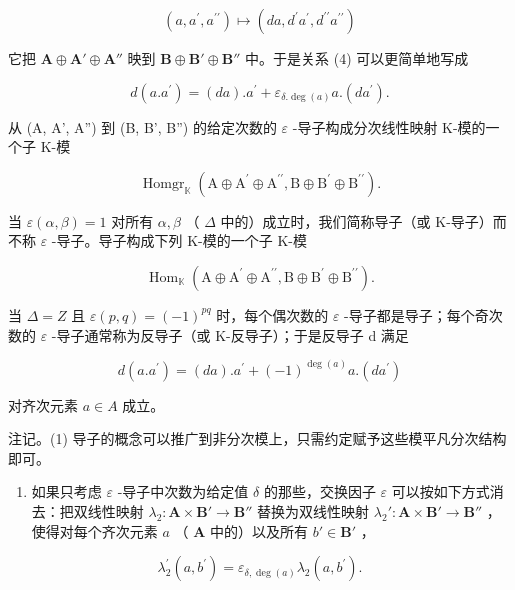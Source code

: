 \[
(a, a ^ {\prime}, a ^ {\prime \prime}) \mapsto (d a, d ^ {\prime} a ^ {\prime}, d ^ {\prime \prime} a ^ {\prime \prime})
\]

它把 \(\mathbf{A} \oplus \mathbf{A}' \oplus \mathbf{A}''\) 映到 \(\mathbf{B} \oplus \mathbf{B}' \oplus \mathbf{B}''\) 中。于是关系 (4) 可以更简单地写成

\[
d (a. a ^ {\prime}) = (d a). a ^ {\prime} + \varepsilon_ {\delta . \deg (a)} a. (d a ^ {\prime}).\tag{5}
\]

从 (A, A', A'') 到 (B, B', B'') 的给定次数的 \(\varepsilon\) -导子构成分次线性映射 K-模的一个子 K-模

\[
\operatorname{Homgr} _ {\mathbb {K}} (\mathrm{A} \oplus \mathrm{A} ^ {\prime} \oplus \mathrm{A} ^ {\prime \prime}, \mathrm{B} \oplus \mathrm{B} ^ {\prime} \oplus \mathrm{B} ^ {\prime \prime}).
\]

当 \(\varepsilon(\alpha, \beta) = 1\) 对所有 \(\alpha, \beta\) （ \(\Delta\) 中的）成立时，我们简称导子（或 K-导子）而不称 \(\varepsilon\) -导子。导子构成下列 K-模的一个子 K-模

\[
\operatorname{Hom} _ {\mathbb {K}} (\mathrm{A} \oplus \mathrm{A} ^ {\prime} \oplus \mathrm{A} ^ {\prime \prime}, \mathrm{B} \oplus \mathrm{B} ^ {\prime} \oplus \mathrm{B} ^ {\prime \prime}).
\]

当 \(\Delta = Z\) 且 \(\varepsilon(p, q) = (-1)^{pq}\) 时，每个偶次数的 \(\varepsilon\) -导子都是导子；每个奇次数的 \(\varepsilon\) -导子通常称为反导子（或 K-反导子）；于是反导子 d 满足

\[
d (a. a ^ {\prime}) = (d a). a ^ {\prime} + (- 1) ^ {\deg (a)} a. (d a ^ {\prime})\tag{6}
\]

对齐次元素 \(a \in A\) 成立。

注记。(1) 导子的概念可以推广到非分次模上，只需约定赋予这些模平凡分次结构即可。

\begin{enumerate}
\def\labelenumi{(\arabic{enumi})}
\setcounter{enumi}{1}
\tightlist
\item
  如果只考虑 \(\varepsilon\) -导子中次数为给定值 \(\delta\) 的那些，交换因子 \(\varepsilon\) 可以按如下方式消去：把双线性映射 \(\lambda_2: \mathbf{A} \times \mathbf{B}' \to \mathbf{B}''\) 替换为双线性映射 \(\lambda_2': \mathbf{A} \times \mathbf{B}' \to \mathbf{B}''\) ，使得对每个齐次元素 \(a\) （ \(\mathbf{A}\) 中的）以及所有 \(b' \in \mathbf{B}'\) ，
\end{enumerate}

\[
\lambda_ {2} ^ {\prime} (a, b ^ {\prime}) = \varepsilon_ {\delta , \deg (a)} \lambda_ {2} (a, b ^ {\prime}).
\]

